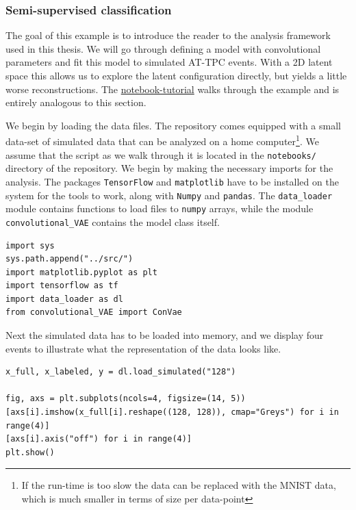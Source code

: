 \subsubsection{Semi-supervised classification}

The goal of this example is to introduce the reader to the analysis framework used in this thesis. We will go through defining a model with convolutional parameters and fit this model to simulated AT-TPC events. With a 2D latent space this allows us to explore the latent configuration directly, but yields a little worse reconstructions. The \href{https://github.com/ATTPC/VAE-event-classification/blob/master/notebooks/simulated_tutorial.ipynb}{notebook-tutorial} walks through the example and is entirely analogous to this section.

We begin by loading the data files. The repository comes equipped with a small data-set of simulated data that can be analyzed on a home computer\footnote{If the run-time is too slow the data can be replaced with the MNIST data, which is much smaller in terms of size per data-point}. We assume that the script as we walk through it is located in the \lstinline{notebooks/} directory of the repository. We begin by making the necessary imports for the analysis. The packages \lstinline{TensorFlow} and \lstinline{matplotlib} have to be installed on the system for the tools to work, along with \lstinline{Numpy} and \lstinline{pandas}. The \lstinline{data_loader} module contains functions to load files to \lstinline{numpy} arrays, while the module \lstinline{convolutional_VAE} contains the model class itself.

\begin{minipage}{\linewidth}
\begin{lstlisting}[language=iPython]
import sys
sys.path.append("../src/")
import matplotlib.pyplot as plt
import tensorflow as tf
import data_loader as dl
from convolutional_VAE import ConVae
\end{lstlisting}
\end{minipage}

\noindent Next the simulated data has to be loaded into memory, and we display four events to illustrate what the representation of the data  looks like.  

\begin{minipage}{\linewidth}
\begin{lstlisting}[language=iPython]
x_full, x_labeled, y = dl.load_simulated("128")

fig, axs = plt.subplots(ncols=4, figsize=(14, 5))
[axs[i].imshow(x_full[i].reshape((128, 128)), cmap="Greys") for i in range(4)]
[axs[i].axis("off") for i in range(4)]
plt.show()
\end{lstlisting}
\end{minipage}

